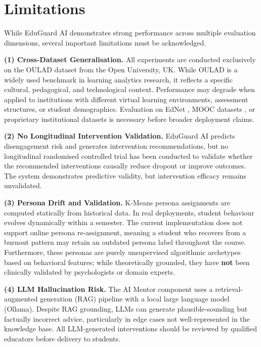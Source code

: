 
\section{Limitations}
\label{sec:limitations}

While EduGuard AI demonstrates strong performance across multiple
evaluation dimensions, several important limitations must be
acknowledged.

\textbf{(1) Cross-Dataset Generalisation.}
All experiments are conducted exclusively on the OULAD dataset from
the Open University, UK. While OULAD is a widely used benchmark in
learning analytics research, it reflects a specific cultural, pedagogical,
and technological context. Performance may degrade when applied to
institutions with different virtual learning environments, assessment
structures, or student demographics. Evaluation on EdNet \cite{choi2020ednet},
MOOC datasets \cite{kizilcec2013deconstructing}, or proprietary
institutional datasets is necessary before broader deployment claims.

\textbf{(2) No Longitudinal Intervention Validation.}
EduGuard AI predicts disengagement risk and generates intervention
recommendations, but no longitudinal randomised controlled trial has
been conducted to validate whether the recommended interventions
causally reduce dropout or improve outcomes. The system demonstrates
predictive validity, but intervention efficacy remains unvalidated.

\textbf{(3) Persona Drift and Validation.}
K-Means persona assignments are computed statically from historical
data. In real deployments, student behaviour evolves dynamically within
a semester. The current implementation does not support online persona
re-assignment, meaning a student who recovers from a burnout pattern
may retain an outdated persona label throughout the course. Furthermore,
these personas are purely unsupervised algorithmic archetypes based on
behavioral features; while theoretically grounded, they have \textbf{not}
been clinically validated by psychologists or domain experts.

\textbf{(4) LLM Hallucination Risk.}
The AI Mentor component uses a retrieval-augmented generation (RAG)
pipeline with a local large language model (Ollama). Despite RAG
grounding, LLMs can generate plausible-sounding but factually incorrect
advice, particularly in edge cases not well-represented in the
knowledge base. All LLM-generated interventions should be reviewed by
qualified educators before delivery to students.

